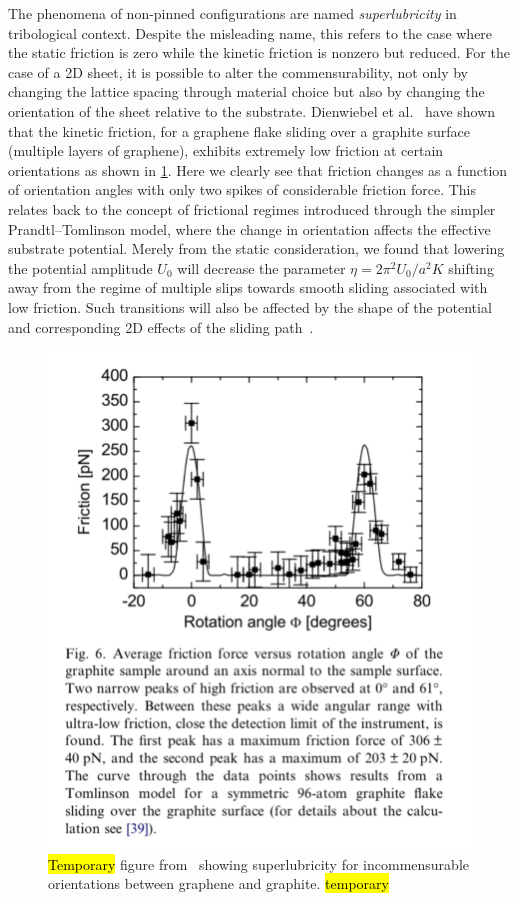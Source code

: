 The phenomena of non-pinned configurations are named \textit{superlubricity} in
tribological context. Despite the misleading name, this refers to the case
where the static friction is zero while the kinetic friction is nonzero but
reduced. For the case of a 2D sheet, it is possible to alter the
commensurability, not only by changing the lattice spacing through material
choice but also by changing the orientation of the sheet relative to the
substrate. Dienwiebel et al.~\cite{DIENWIEBEL2005197} have shown that the
kinetic friction, for a graphene flake sliding over a graphite surface (multiple
layers of graphene), exhibits extremely low friction at certain orientations as
shown in \cref{fig:graphene_rot}. Here we clearly see that friction changes as a
function of orientation angles with only two spikes of considerable friction
force. This relates back to the concept of frictional regimes introduced through
the simpler Prandtl–Tomlinson model, where the change in orientation affects the
effective substrate potential. Merely from the static consideration, we found that
lowering the potential amplitude $U_0$ will decrease the parameter $\eta =
2\pi^2U_0/a^2K$ shifting away from the regime of multiple slips towards smooth
sliding associated with low friction. Such transitions will also be affected by the shape of the
potential and corresponding 2D effects of the sliding path~\cite{Yalin_2011}.

\begin{figure}[H]
  \centering
  \includegraphics[width=0.5\linewidth]{figures/theory/graphene_rot.png}
  \caption{\hl{Temporary} figure from~\cite{DIENWIEBEL2005197} showing superlubricity for incommensurable orientations between graphene and graphite. \hl{temporary}}
  \label{fig:graphene_rot}
\end{figure}




